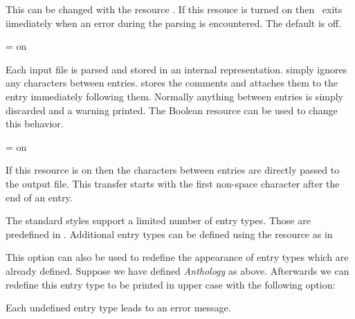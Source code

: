 \documentclass[11pt,a4paper]{scrbook}
\begin{document}
This can be changed with the resource . If this
resouce is turned on then \BibTool\ exits iimediately when an error during the
parsing is encountered. The default is \textsf{off}.
\begin{Resources}
   = on
\end{Resources}

Each input file is parsed and stored in an internal representation. \BibTeX{}
simply ignores any characters between entries. \BibTool{} stores the comments
and attaches them to the entry immediately following them. Normally anything
between entries is simply discarded and a warning printed. The Boolean
resource  can be used to change this behavior.

\begin{Resources}
   = on
\end{Resources}

If this resource is on then the characters between entries are directly passed
to the output file. This transfer starts with the first non-space character
after the end of an entry.

The standard \BibTeX{} styles support a limited number of entry types. Those
are predefined in \BibTool. Additional entry types can be defined using the
resource  as in

\begin{Resources}
\end{Resources}

This option can also be used to redefine the appearance of entry types which
are already defined. Suppose we have defined \emph{Anthology} as above.
Afterwards we can redefine this entry type to be printed in upper case with
the following option:

\begin{Resources}
\end{Resources}

Each undefined entry type leads to an error message.
\end{document}

